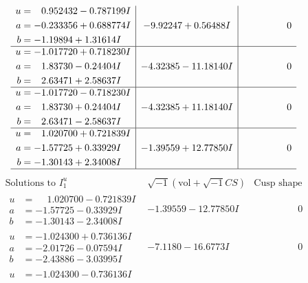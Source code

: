 \documentclass[1p]{elsarticle_modified}
\theoremstyle{definition}
\newcommand{\I}{\sqrt{-1}}
\begin{document}
$$\begin{array}{c|c|c}
\begin{aligned}
u &= \phantom{-}0.952432 - 0.787199 I \\
a &= -0.233356 + 0.688774 I \\
b &= -1.19894 + 1.31614 I\end{aligned}
 & -9.92247 + 0.56488 I & \phantom{-0.000000 } 0 \\ \hline\begin{aligned}
u &= -1.017720 + 0.718230 I \\
a &= \phantom{-}1.83730 - 0.24404 I \\
b &= \phantom{-}2.63471 + 2.58637 I\end{aligned}
 & -4.32385 - 11.18140 I & \phantom{-0.000000 } 0 \\ \hline\begin{aligned}
u &= -1.017720 - 0.718230 I \\
a &= \phantom{-}1.83730 + 0.24404 I \\
b &= \phantom{-}2.63471 - 2.58637 I\end{aligned}
 & -4.32385 + 11.18140 I & \phantom{-0.000000 } 0 \\ \hline\begin{aligned}
u &= \phantom{-}1.020700 + 0.721839 I \\
a &= -1.57725 + 0.33929 I \\
b &= -1.30143 + 2.34008 I\end{aligned}
 & -1.39559 + 12.77850 I & \phantom{-0.000000 } 0\\
 \hline 
 \end{array}$$\newpage$$\begin{array}{c|c|c}  
\text{Solutions to }I^u_{1}& \I (\text{vol} + \sqrt{-1}CS) & \text{Cusp shape}\\
 \hline 
\begin{aligned}
u &= \phantom{-}1.020700 - 0.721839 I \\
a &= -1.57725 - 0.33929 I \\
b &= -1.30143 - 2.34008 I\end{aligned}
 & -1.39559 - 12.77850 I & \phantom{-0.000000 } 0 \\ \hline\begin{aligned}
u &= -1.024300 + 0.736136 I \\
a &= -2.01726 - 0.07594 I \\
b &= -2.43886 - 3.03995 I\end{aligned}
 & -7.1180 - 16.6773 I & \phantom{-0.000000 } 0 \\ \hline\begin{aligned}
u &= -1.024300 - 0.736136 I \\

\end{aligned}
\end{array}$$
\end{document}
